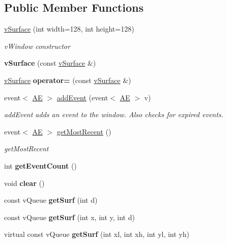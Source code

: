 \subsection*{Public Member Functions}
\begin{DoxyCompactItemize}
\item 
\hyperlink{classev_1_1vSurface_afb642ce656aee165c54a2238474599c0}{v\+Surface} (int width=128, int height=128)
\begin{DoxyCompactList}\small\item\em v\+Window constructor \end{DoxyCompactList}\item 
\mbox{\label{classev_1_1vSurface_a592c1c79ff294f34e28503d7c7278b8f}} 
{\bfseries v\+Surface} (const \hyperlink{classev_1_1vSurface}{v\+Surface} \&)
\item 
\mbox{\label{classev_1_1vSurface_af779bb51b4c9f748a0cd38117cf5e1f9}} 
\hyperlink{classev_1_1vSurface}{v\+Surface} {\bfseries operator=} (const \hyperlink{classev_1_1vSurface}{v\+Surface} \&)
\item 
event$<$ \hyperlink{classev_1_1AddressEvent}{AE} $>$ \hyperlink{classev_1_1vSurface_a60d2f3d18c68d18678040cfabf6d35ea}{add\+Event} (event$<$ \hyperlink{classev_1_1AddressEvent}{AE} $>$ v)
\begin{DoxyCompactList}\small\item\em add\+Event adds an event to the window. Also checks for expired events. \end{DoxyCompactList}\item 
event$<$ \hyperlink{classev_1_1AddressEvent}{AE} $>$ \hyperlink{classev_1_1vSurface_a523c84d62fa48db30913dee7e694b895}{get\+Most\+Recent} ()
\begin{DoxyCompactList}\small\item\em get\+Most\+Recent \end{DoxyCompactList}\item 
\mbox{\label{classev_1_1vSurface_aa90e7d977149ee42dff7a2735b367a2b}} 
int {\bfseries get\+Event\+Count} ()
\item 
\mbox{\label{classev_1_1vSurface_a222eadfa9d900d22148d1ffb0bb68661}} 
void {\bfseries clear} ()
\item 
\mbox{\label{classev_1_1vSurface_a2beddf5b5ffdbe12c1592ef8c1c742ab}} 
const v\+Queue {\bfseries get\+Surf} (int d)
\item 
\mbox{\label{classev_1_1vSurface_af6565b2434916ebc73820fb870e6f9a9}} 
const v\+Queue {\bfseries get\+Surf} (int x, int y, int d)
\item 
\mbox{\label{classev_1_1vSurface_ae27682a1a876ef2c3b8c37c63c5a531c}} 
virtual const v\+Queue {\bfseries get\+Surf} (int xl, int xh, int yl, int yh)
\end{DoxyCompactItemize}
